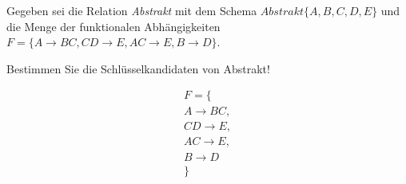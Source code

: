 \documentclass{lehramt-informatik-haupt}
\begin{document}
Gegeben sei die Relation \emph{Abstrakt} mit dem Schema $Abstrakt\{A, B, C, D,
E\}$ und die Menge der funktionalen Abhängigkeiten $F = \{A \rightarrow
BC, CD \rightarrow E, AC \rightarrow E, B \rightarrow D\}$.

\noindent
Bestimmen Sie die Schlüsselkandidaten von Abstrakt!

\begin{multline*}
F = \{ \\
  A \rightarrow BC, \\
  CD \rightarrow E, \\
  AC \rightarrow E, \\
  B \rightarrow D \\
\}
\end{multline*}

%

\literatur
\end{document}
